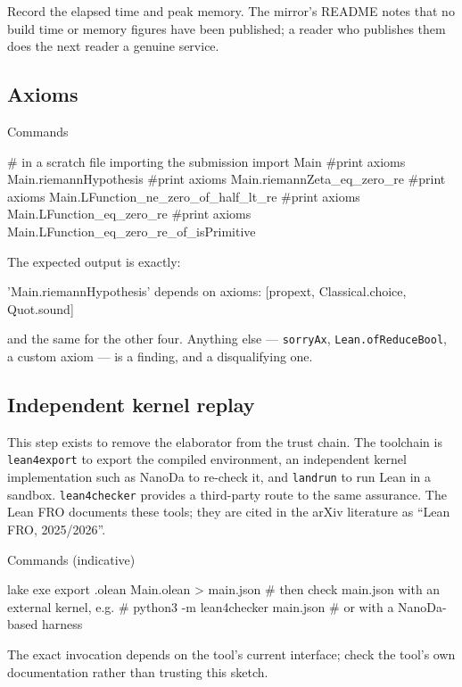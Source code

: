 Record the elapsed time and peak memory. The mirror's README notes that no
build time or memory figures have been published; a reader who publishes them
does the next reader a genuine service.

\subsection{Axioms}\begin{seamnote}{Commands}
\begin{leanquote}
# in a scratch file importing the submission
import Main
#print axioms Main.riemannHypothesis
#print axioms Main.riemannZeta_eq_zero_re
#print axioms Main.LFunction_ne_zero_of_half_lt_re
#print axioms Main.LFunction_eq_zero_re
#print axioms Main.LFunction_eq_zero_re_of_isPrimitive
\end{leanquote}
\end{seamnote}

The expected output is exactly:

\begin{leanquote}
'Main.riemannHypothesis' depends on axioms: [propext, Classical.choice, Quot.sound]
\end{leanquote}

and the same for the other four. Anything else --- \texttt{sorryAx},
\texttt{Lean.ofReduceBool}, a custom axiom --- is a finding, and a
disqualifying one.

\subsection{Independent kernel replay}This step exists to remove the elaborator from the trust chain. The toolchain
is \texttt{lean4export} to export the compiled environment, an independent
kernel implementation such as NanoDa to re-check it, and \texttt{landrun} to
run Lean in a sandbox. \texttt{lean4checker} provides a third-party route to
the same assurance. The Lean FRO documents these tools; they are cited in the
arXiv literature as ``Lean FRO, 2025/2026''.

\begin{seamnote}{Commands (indicative)}
\begin{leanquote}
lake exe export .olean Main.olean > main.json
# then check main.json with an external kernel, e.g.
#   python3 -m lean4checker main.json
# or with a NanoDa-based harness
\end{leanquote}
The exact invocation depends on the tool's current interface; check the
tool's own documentation rather than trusting this sketch.
\end{seamnote}

